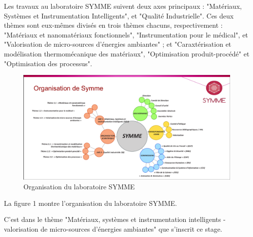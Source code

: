 \documentclass[a4paper, french, 12pt, titlepage]{report}
\begin{document}
Les travaux au laboratoire SYMME suivent deux axes principaux : "Matériaux, Systèmes et Instrumentation Intelligents", et "Qualité Industrielle". Ces deux thèmes sont eux-mêmes divisés en trois thèmes chacuns, respectivement : "Matériaux et nanomatériaux fonctionnels", "Instrumentation pour le médical", et "Valorisation de micro-sources d'énergies ambiantes" ; et "Caraxtérisation et modélisation thermomécanique des matériaux", "Optimisation produit-procédé" et "Optimisation des processus". \\

\begin{figure}
  \includegraphics[width=\linewidth]{organigramme.png}
  \caption{Organisation du laboratoire SYMME}
  \label{fig:organigramme}
\end{figure}
La figure 1 montre l'organisation du laboratoire SYMME. 

C'est dans le thème "Matériaux, systèmes et instrumentation intelligents - valorisation de micro-sources d'énergies ambiantes" que s'inscrit ce stage. 
\end{document}
